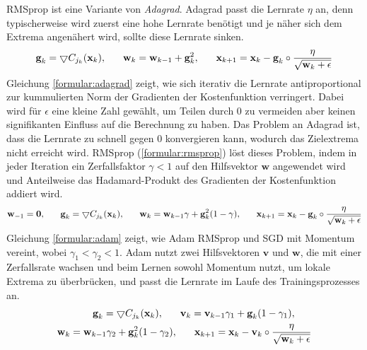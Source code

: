 RMSprop ist eine Variante von \textit{Adagrad}.
Adagrad passt die Lernrate $\eta$ an, denn typischerweise wird zuerst eine hohe Lernrate benötigt und je näher sich dem Extrema angenähert wird,
sollte diese Lernrate sinken.
\begin{align}
    \label{formular:adagrad}
    \textbf{g}_k = \bigtriangledown C_{j_k}(\textbf{x}_k), \hspace{0.6cm}
    \textbf{w}_k = \textbf{w}_{k-1} + \textbf{g}_k^2, \hspace{0.6cm}
    \textbf{x}_{k+1} = \textbf{x}_k - \textbf{g}_k \circ \frac{\eta}{\sqrt{\textbf{w}_k + \epsilon}}
\end{align}
Gleichung \ref{formular:adagrad} zeigt, wie sich iterativ die Lernrate antiproportional
zur kummulierten Norm der Gradienten der Kostenfunktion verringert.
Dabei wird für $\epsilon$ eine kleine Zahl gewählt, um Teilen durch 0 zu vermeiden aber keinen signifikanten Einfluss auf die Berechnung zu haben.
\newline
\newline
Das Problem an Adagrad ist, dass die Lernrate zu schnell gegen 0 konvergieren kann, wodurch das Zielextrema nicht erreicht wird.
RMSprop (\ref{formular:rmsprop}) löst dieses Problem, indem in jeder Iteration ein Zerfallsfaktor $\gamma < 1$ auf den Hilfsvektor $\textbf{w}$ angewendet wird
und Anteilweise das Hadamard-Produkt des Gradienten der Kostenfunktion addiert wird.
\begin{align}
    \label{formular:rmsprop}
    \textbf{w}_{-1} = \textbf{0}, \hspace{0.6cm}
    \textbf{g}_k = \bigtriangledown C_{j_k}(\textbf{x}_k), \hspace{0.6cm}
    \textbf{w}_k = \textbf{w}_{k-1}\gamma + \textbf{g}_k^2 (1-\gamma), \hspace{0.6cm}
    \textbf{x}_{k+1} = \textbf{x}_k - \textbf{g}_k \circ \frac{\eta}{\sqrt{\textbf{w}_k + \epsilon}}
\end{align}
Gleichung \ref{formular:adam} zeigt, wie Adam RMSprop und SGD mit Momentum vereint, wobei $\gamma_1 < \gamma_2 < 1$.
Adam nutzt zwei Hilfsvektoren $\textbf{v}$ und $\textbf{w}$, die mit einer Zerfallsrate wachsen und beim Lernen
sowohl Momentum nutzt, um lokale Extrema zu überbrücken, und passt die Lernrate im Laufe des Trainingsprozesses an.
\begin{align}
    \label{formular:adam}
    \textbf{g}_k = \bigtriangledown C_{j_k}(\textbf{x}_k), \hspace{0.6cm}
    \textbf{v}_k = \textbf{v}_{k-1}\gamma_1 + \textbf{g}_k (1-\gamma_1), \hspace{0.6cm} \nonumber\\
    \textbf{w}_k = \textbf{w}_{k-1}\gamma_2 + \textbf{g}_k^2 (1-\gamma_2), \hspace{0.6cm}
    \textbf{x}_{k+1} = \textbf{x}_k - \textbf{v}_k \circ \frac{\eta}{\sqrt{\textbf{w}_k + \epsilon}}
\end{align}

